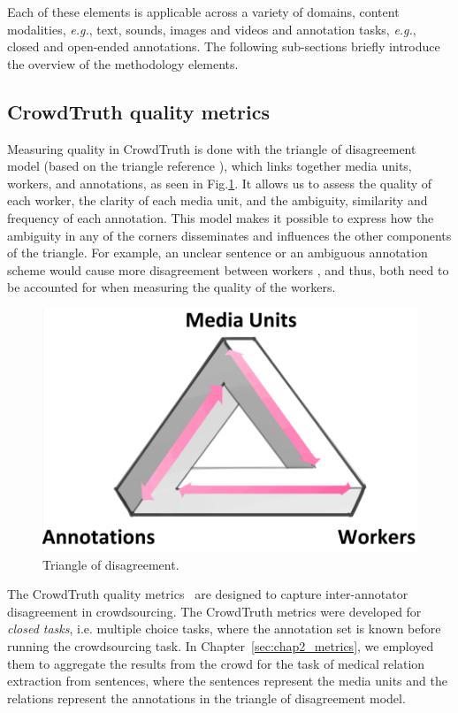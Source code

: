 Each of these elements is applicable across a variety of domains, content modalities, \emph{e.g.}, text, sounds, images and videos and annotation tasks, \emph{e.g.}, closed and open-ended annotations. The following sub-sections briefly introduce the overview of the methodology elements.

\subsection{CrowdTruth quality metrics}
\label{subsec:metrics}

Measuring quality in CrowdTruth is done with  the triangle of disagreement model (based on the triangle reference \cite{knowlton1966definition}), which links together media units, workers, and annotations, as seen in Fig.\ref{fig:triangle_of_reference}. It allows us to assess the quality of each worker, the clarity of each media unit, and the ambiguity, similarity and frequency of each annotation. This model makes it possible to express how the ambiguity in any of the corners disseminates and influences the other components of the triangle. For example, an unclear sentence or an ambiguous annotation scheme would cause more disagreement between workers \cite{aroyo2014threesides}, and thus, both need to be accounted for when measuring the quality of the workers. 

 \begin{figure}[!hpt]
 	\centering
 		\includegraphics[width=0.5\linewidth]{img/triangle.png}
 	\caption{Triangle of disagreement.}
 	\label{fig:triangle_of_reference}
 \end{figure}

The CrowdTruth quality metrics~\cite{aroyo2014threesides} are designed to capture inter-annotator disagreement in crowdsourcing. The CrowdTruth metrics were developed for \textit{closed tasks}, i.e. multiple choice tasks, where the annotation set is known before running the crowdsourcing task. In Chapter~\ref{sec:chap2_metrics}, we employed them to aggregate the results from the crowd for the task of medical relation extraction from sentences, where the sentences represent the media units and the relations represent the annotations in the triangle of disagreement model.

